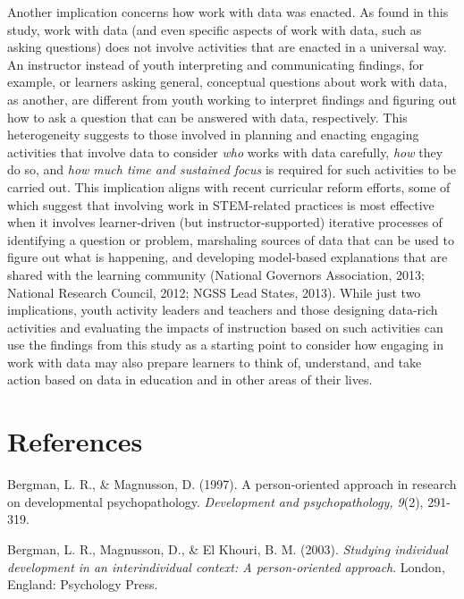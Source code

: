 \documentclass[]{msu-thesis}
\theoremstyle{definition}
\theoremstyle{definition}
\theoremstyle{definition}
\theoremstyle{remark}
\begin{document}
Another implication concerns how work with data was enacted. As found in
this study, work with data (and even specific aspects of work with data,
such as asking questions) does not involve activities that are enacted
in a universal way. An instructor instead of youth interpreting and
communicating findings, for example, or learners asking general,
conceptual questions about work with data, as another, are different
from youth working to interpret findings and figuring out how to ask a
question that can be answered with data, respectively. This
heterogeneity suggests to those involved in planning and enacting
engaging activities that involve data to consider \emph{who} works with
data carefully, \emph{how} they do so, and \emph{how much time and
sustained focus} is required for such activities to be carried out. This
implication aligns with recent curricular reform efforts, some of which
suggest that involving work in STEM-related practices is most effective
when it involves learner-driven (but instructor-supported) iterative
processes of identifying a question or problem, marshaling sources of
data that can be used to figure out what is happening, and developing
model-based explanations that are shared with the learning community
(National Governors Association, 2013; National Research Council, 2012;
NGSS Lead States, 2013). While just two implications, youth activity
leaders and teachers and those designing data-rich activities and
evaluating the impacts of instruction based on such activities can use
the findings from this study as a starting point to consider how
engaging in work with data may also prepare learners to think of,
understand, and take action based on data in education and in other
areas of their lives.

\chapter{References}\label{references}

\setlength{\parindent}{-0.2in} \setlength{\leftskip}{0.2in}
\setlength{\parskip}{8pt} \noindent

Bergman, L. R., \& Magnusson, D. (1997). A person-oriented approach in
research on developmental psychopathology. \emph{Development and
psychopathology, 9}(2), 291-319.

Bergman, L. R., Magnusson, D., \& El Khouri, B. M. (2003).
\emph{Studying individual development in an interindividual context: A
person-oriented approach}. London, England: Psychology Press.
\end{document}
